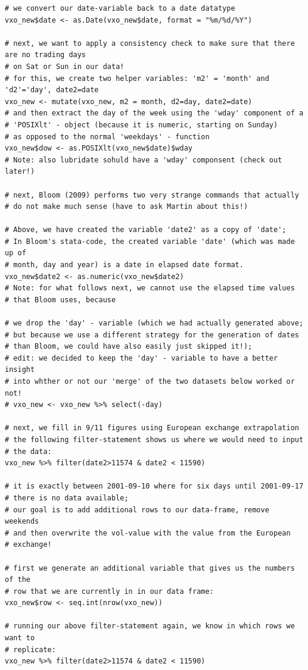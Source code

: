 \documentclass[a4paper,12pt,oneside,pointednumbers,bibtotoc,bigheadings,liststotoc]{scrbook}
\begin{document}
\begin{verbatim}
# we convert our date-variable back to a date datatype
vxo_new$date <- as.Date(vxo_new$date, format = "%m/%d/%Y")

# next, we want to apply a consistency check to make sure that there are no trading days
# on Sat or Sun in our data!
# for this, we create two helper variables: 'm2' = 'month' and 'd2'='day', date2=date
vxo_new <- mutate(vxo_new, m2 = month, d2=day, date2=date)
# and then extract the day of the week using the 'wday' component of a 
# 'POSIXlt' - object (because it is numeric, starting on Sunday)
# as opposed to the normal 'weekdays' - function
vxo_new$dow <- as.POSIXlt(vxo_new$date)$wday
# Note: also lubridate sohuld have a 'wday' componsent (check out later!)

# next, Bloom (2009) performs two very strange commands that actually
# do not make much sense (have to ask Martin about this!)

# Above, we have created the variable 'date2' as a copy of 'date';
# In Bloom's stata-code, the created variable 'date' (which was made up of
# month, day and year) is a date in elapsed date format.
vxo_new$date2 <- as.numeric(vxo_new$date2)
# Note: for what follows next, we cannot use the elapsed time values
# that Bloom uses, because 

# we drop the 'day' - variable (which we had actually generated above;
# but because we use a different strategy for the generation of dates
# than Bloom, we could have also easily just skipped it!);
# edit: we decided to keep the 'day' - variable to have a better insight
# into whther or not our 'merge' of the two datasets below worked or not!
# vxo_new <- vxo_new %>% select(-day)

# next, we fill in 9/11 figures using European exchange extrapolation
# the following filter-statement shows us where we would need to input
# the data:
vxo_new %>% filter(date2>11574 & date2 < 11590)

# it is exactly between 2001-09-10 where for six days until 2001-09-17
# there is no data available;
# our goal is to add additional rows to our data-frame, remove weekends
# and then overwrite the vol-value with the value from the European
# exchange!

# first we generate an additional variable that gives us the numbers of the
# row that we are currently in in our data frame:
vxo_new$row <- seq.int(nrow(vxo_new))

# running our above filter-statement again, we know in which rows we want to 
# replicate:
vxo_new %>% filter(date2>11574 & date2 < 11590)


\end{verbatim}
\end{document}
